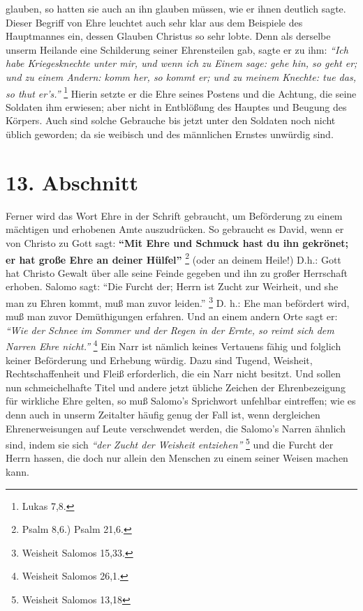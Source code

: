 glauben, so hatten sie auch an ihn glauben müssen, wie er ihnen deutlich sagte.
Dieser Begriff von Ehre leuchtet auch sehr klar aus dem Beispiele des
Hauptmannes ein, dessen Glauben Christus so sehr lobte. Denn als derselbe unserm
Heilande eine Schilderung seiner Ehrensteilen gab, sagte er zu ihm:
\textit{"`Ich habe
Kriegesknechte unter mir, und wenn ich zu Einem sage: gehe hin, so geht er; und
zu einem Andern: komm her, so kommt er; und zu meinem Knechte: tue das, so thut
er’s."'}
\footnote{Lukas 7,8.}
Hierin setzte er die Ehre seines Postens und die
Achtung, die seine Soldaten ihm erwiesen; aber nicht in Entblößung des Hauptes
und Beugung des Körpers. Auch sind solche Gebrauche bis jetzt unter den Soldaten
noch nicht üblich geworden; da sie weibisch und des männlichen Ernstes unwürdig
sind.

\section{13. Abschnitt} \label{kap9_ab13}

Ferner wird das Wort Ehre in der Schrift gebraucht, um Beförderung zu einem
mächtigen und erhobenen Amte auszudrücken. So gebraucht es David, wenn er von
Christo zu Gott sagt:
\textbf{"`Mit Ehre und Schmuck hast du ihn gekrönet; er hat große
Ehre an deiner Hülfel"'}
\footnote{Psalm 8,6.) Psalm 21,6.}
(oder an deinem Heile!) D.h.: Gott hat Christo Gewalt über alle seine Feinde gegeben und ihn zu großer
Herrschaft erhoben. Salomo  sagt:
"`Die Furcht der; Herrn ist Zucht zur Weirheit,
und she man zu Ehren kommt, muß man zuvor leiden."'
\footnote{Weisheit Salomos 15,33.}
D. h.: Ehe man befördert wird, muß man zuvor Demüthigungen erfahren. Und an
einem andern Orte sagt er:
\textit{"`Wie der Schnee im Sommer und der Regen in der
Ernte, so reimt sich dem Narren Ehre nicht."'}
\footnote{Weisheit Salomos 26,1.}
Ein Narr ist
nämlich keines Vertauens fähig und folglich keiner Beförderung und Erhebung
würdig. Dazu sind Tugend, Weisheit, Rechtschaffenheit und Fleiß erforderlich,
die ein Narr nicht besitzt. Und sollen nun schmeichelhafte Titel und andere
jetzt übliche Zeichen der Ehrenbezeigung für wirkliche Ehre gelten, so muß
Salomo’s  Sprichwort unfehlbar eintreffen; wie es denn auch in unserm Zeitalter
häufig genug der Fall ist, wenn dergleichen Ehrenerweisungen auf Leute
verschwendet werden, die Salomo’s Narren ähnlich sind, indem sie sich
\textit{"`der Zucht der Weisheit entziehen"'}
\footnote{Weisheit Salomos 13,18}
und die Furcht der
Herrn hassen, die doch nur allein den Menschen zu einem seiner Weisen machen
kann.

